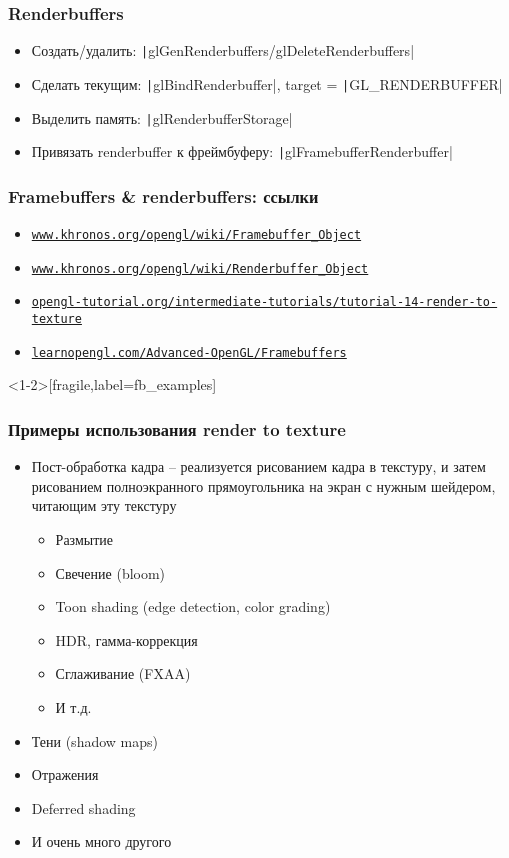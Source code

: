 \documentclass[10pt]{beamer}
\begin{document}
\begin{frame}[fragile]
\frametitle{Renderbuffers}
\begin{itemize}
\item Создать/удалить: \texttt|glGenRenderbuffers/glDeleteRenderbuffers|
\pause
\item Сделать текущим: \texttt|glBindRenderbuffer|, target = \texttt|GL_RENDERBUFFER|
\pause
\item Выделить память: \texttt|glRenderbufferStorage|
\pause
\item Привязать renderbuffer к фреймбуферу: \texttt|glFramebufferRenderbuffer|
\end{itemize}
\end{frame}

\begin{frame}[fragile]
\frametitle{Framebuffers \& renderbuffers: ссылки}
\begin{itemize}
\item \href{https://www.khronos.org/opengl/wiki/Framebuffer_Object}{\nolinkurl{www.khronos.org/opengl/wiki/Framebuffer\_Object}}
\item \href{https://www.khronos.org/opengl/wiki/Renderbuffer_Object}{\nolinkurl{www.khronos.org/opengl/wiki/Renderbuffer\_Object}}
\item \href{http://www.opengl-tutorial.org/intermediate-tutorials/tutorial-14-render-to-texture}{\nolinkurl{opengl-tutorial.org/intermediate-tutorials/tutorial-14-render-to-texture}}
\item \href{https://learnopengl.com/Advanced-OpenGL/Framebuffers}{\nolinkurl{learnopengl.com/Advanced-OpenGL/Framebuffers}}
\end{itemize}
\end{frame}

\begin{frame}<1-2>[fragile,label=fb_examples]
\frametitle{Примеры использования render to texture}
\begin{itemize}
\item Пост-обработка кадра -- реализуется рисованием кадра в текстуру, и затем рисованием полноэкранного прямоугольника на экран с нужным шейдером, читающим эту текстуру
\pause
\begin{itemize}
\item Размытие
\pause
\item Свечение (bloom)
\pause
\item Toon shading (edge detection, color grading)
\pause
\item HDR, гамма-коррекция
\pause
\item Сглаживание (FXAA)
\pause
\item И т.д.
\end{itemize}
\pause
\item Тени (shadow maps)
\pause
\item Отражения
\pause
\item Deferred shading
\pause
\item И очень много другого
\end{itemize}
\end{frame}
\end{document}
